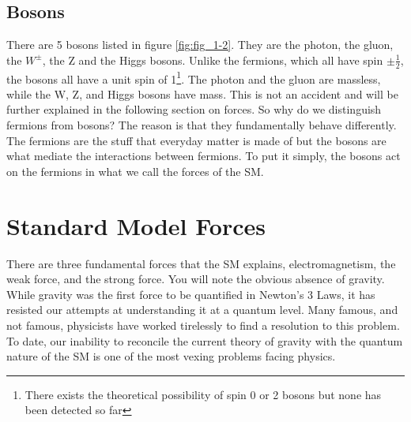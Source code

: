 \subsection{Bosons}
There are 5 bosons listed in figure \ref{fig:fig_1-2}. They are the photon, the gluon, the $W^{\pm}$, the Z and the Higgs bosons.
Unlike the fermions, which all have spin $\pm \frac{1}{2}$, the bosons all have a unit spin of 1\footnote{There exists the theoretical possibility of spin 0 or 2 bosons but none has been detected so far}.
The photon and the gluon are massless, while the W, Z, and Higgs bosons have mass. This is not an accident and will be further explained in the following section on forces. So why do we distinguish fermions from bosons?
The reason is that they fundamentally behave differently. The fermions are the stuff that everyday matter is made of but the bosons are what mediate the interactions between fermions. 
To put it simply, the bosons act on the fermions in what we call the forces of the SM.\\

\section{Standard Model Forces}
There are three fundamental forces that the SM explains, electromagnetism, the weak force, and the strong force. You will note the obvious absence of gravity.
While gravity was the first force to be quantified in Newton's 3 Laws, it has resisted our attempts at understanding it at a quantum level. Many famous, and not famous, physicists have worked tirelessly to find a resolution to this problem.
To date, our inability to reconcile the current theory of gravity with the quantum nature of the SM is one of the most vexing problems facing physics.


